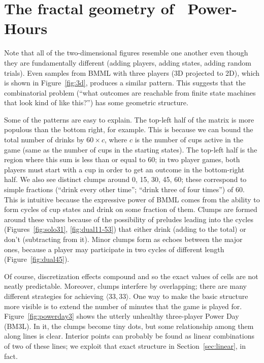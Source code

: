 \documentclass[twocolumn]{article}
\begin{document}
\section{The fractal geometry of \kn\ Power-Hours}

Note that all of the two-dimensional figures resemble one another even
though they are fundamentally different (adding players, adding
states, adding random trials). Even samples from BMML with three
players (3D projected to 2D), which is shown in Figure~\ref{fig:3d},
produces a similar pattern. This suggests that the combinatorial
problem (``what outcomes are reachable from finite state machines that
look kind of like this?'') has some geometric structure.

Some of the patterns are easy to explain. The top-left half of the
matrix is more populous than the bottom right, for example. This is
because we can bound the total number of drinks by $60 \times c$,
where $c$ is the number of cups active in the game (same as the number
of cups in the starting states). The top-left half is the region where
this sum is less than or equal to 60; in two player games, both
players must start with a cup in order to get an outcome in the
bottom-right half. We also see distinct clumps around 0, 15, 30, 45,
60; these correspond to simple fractions (``drink every other time'';
``drink three of four times'') of 60. This is intuitive because the
expressive power of BMML comes from the ability to form cycles of cup
states and drink on some fraction of them. Clumps are formed around
these values because of the possibility of preludes leading into the
cycles (Figures~\ref{fig:solo31}, \ref{fig:dual11-53}) that either
drink (adding to the total) or don't (subtracting from it). Minor
clumps form as echoes between the major ones, because a player may
participate in two cycles of different length
(Figure~\ref{fig:dual45}).

Of course, discretization effects compound and so the exact values of
cells are not neatly predictable. Moreover, clumps interfere by
overlapping; there are many different strategies for achieving
$\langle 33, 33 \rangle$. One way to make the basic structure more
visible is to extend the number of minutes that the game is played
for. Figure~\ref{fig:powerday3} shows the utterly unhealthy
three-player Power Day (BM3L). In it, the clumps become tiny dots,
but some relationship among them along lines is clear. Interior points
can probably be found as linear combinations of two of these lines;
we exploit that exact structure in Section~\ref{sec:linear}, in fact.
\end{document}
